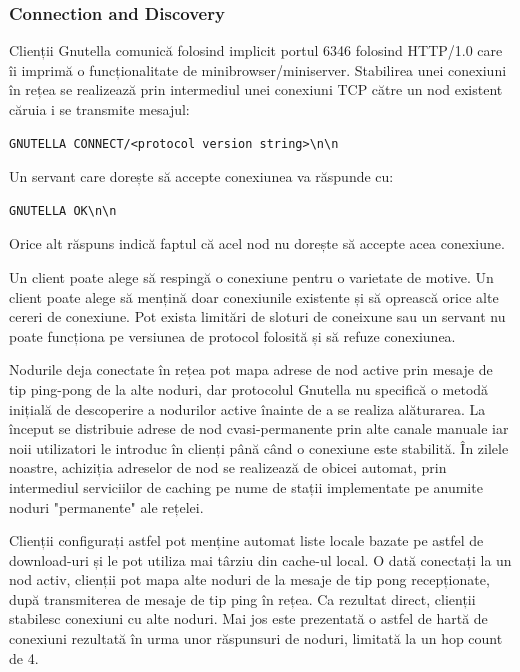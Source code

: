 \subsubsection{Connection and Discovery}

Clienții Gnutella comunică folosind implicit portul 6346 folosind HTTP/1.0
care îi imprimă o funcționalitate de minibrowser/miniserver. Stabilirea unei
conexiuni în rețea se realizează prin intermediul unei conexiuni TCP către un
nod existent căruia i se transmite mesajul:

\begin{verbatim}
GNUTELLA CONNECT/<protocol version string>\n\n
\end{verbatim}

Un servant care dorește să accepte conexiunea va răspunde cu:
\begin{verbatim}
GNUTELLA OK\n\n
\end{verbatim}

Orice alt răspuns indică faptul că acel nod nu dorește să accepte acea
conexiune.

Un client poate alege să respingă o conexiune pentru o varietate de motive. Un
client poate alege să mențină doar conexiunile existente și să oprească orice
alte cereri de conexiune. Pot exista limitări de sloturi de coneixune sau un
servant nu poate funcționa pe versiunea de protocol folosită și să refuze
conexiunea.

Nodurile deja conectate în rețea pot mapa adrese de nod active prin mesaje de
tip ping-pong de la alte noduri, dar protocolul Gnutella nu specifică o metodă
inițială de descoperire a nodurilor active înainte de a se realiza alăturarea.
La început se distribuie adrese de nod cvasi-permanente prin alte canale
manuale iar noii utilizatori le introduc în clienți până când o conexiune este
stabilită. În zilele noastre, achiziția adreselor de nod se realizează de
obicei automat, prin intermediul serviciilor de caching pe nume de stații
implementate pe anumite noduri "permanente" ale rețelei.

Clienții configurați astfel pot menține automat liste locale bazate pe astfel
de download-uri și le pot utiliza mai târziu din cache-ul local. O dată
conectați la un nod activ, clienții pot mapa alte noduri de la mesaje de tip
pong recepționate, după transmiterea de mesaje de tip ping în rețea. Ca
rezultat direct, clienții stabilesc conexiuni cu alte noduri. Mai jos este
prezentată o astfel de hartă de conexiuni rezultată în urma unor răspunsuri de
noduri, limitată la un hop count de 4.

